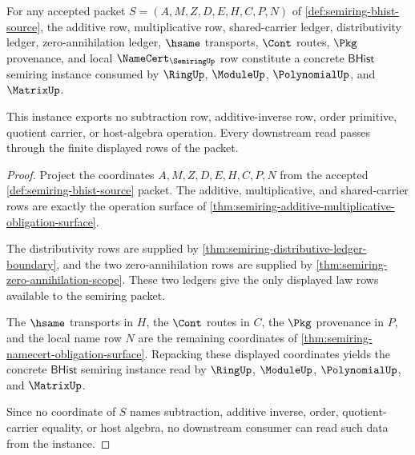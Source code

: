 \begin{theorem}
\label{thm:semiring-concrete-history-instance}
For any accepted packet $S=(A,M,Z,D,E,H,C,P,N)$ of
\autoref{def:semiring-bhist-source}, the additive row, multiplicative row,
shared-carrier ledger, distributivity ledger, zero-annihilation ledger,
$\hsame$ transports, $\Cont$ routes, $\Pkg$ provenance, and local
$\NameCert_{\SemiringUp}$ row constitute a concrete $\mathsf{BHist}$ semiring
instance consumed by $\RingUp$, $\ModuleUp$, $\PolynomialUp$, and $\MatrixUp$.

This instance exports no subtraction row, additive-inverse row, order
primitive, quotient carrier, or host-algebra operation. Every downstream read
passes through the finite displayed rows of the packet.
\end{theorem}
\begin{proof}
Project the coordinates $A,M,Z,D,E,H,C,P,N$ from the accepted
\autoref{def:semiring-bhist-source} packet. The additive, multiplicative, and
shared-carrier rows are exactly the operation surface of
\autoref{thm:semiring-additive-multiplicative-obligation-surface}.

The distributivity rows are supplied by
\autoref{thm:semiring-distributive-ledger-boundary}, and the two
zero-annihilation rows are supplied by
\autoref{thm:semiring-zero-annihilation-scope}. These two ledgers give the
only displayed law rows available to the semiring packet.

The $\hsame$ transports in $H$, the $\Cont$ routes in $C$, the $\Pkg$
provenance in $P$, and the local name row $N$ are the remaining coordinates of
\autoref{thm:semiring-namecert-obligation-surface}. Repacking these displayed
coordinates yields the concrete $\mathsf{BHist}$ semiring instance read by
$\RingUp$, $\ModuleUp$, $\PolynomialUp$, and $\MatrixUp$.

Since no coordinate of $S$ names subtraction, additive inverse, order,
quotient-carrier equality, or host algebra, no downstream consumer can read
such data from the instance.
\end{proof}

